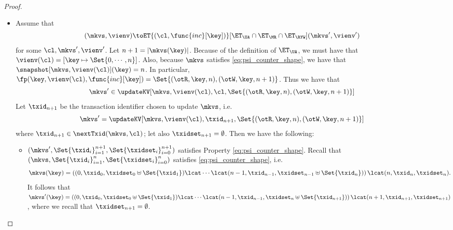 \begin{proof}
\begin{itemize}
\item 
Assume that
\[
(\mkvs, \vienv) \toET{(\cl, \func{inc}[\key])}[\ET_{\UA} \cap \ET_{\MR} \cap  \ET_{\RYW}] (\mkvs', \vienv')
\]
for some $\cl, \mkvs', \vienv'$. Let $n+1 = \lvert \mkvs(\key) \rvert$. Because of the definition of 
$\ET_{\UA}$, we must have that $\vienv(\cl) = [\key \mapsto \Set{0, \cdots, n}]$. Also, 
because $\mkvs$ satisfies \eqref{eq:psi_counter_shape}, we have that $\snapshot[\mkvs, \vienv(\cl)](\key) = n$. 
In particular, $\fp(\key, \vienv(\cl), \func{inc}[\key]) = \Set{(\otR, \key, n), (\otW, \key, n+1)}$. 
Thus we have that 
\[\mkvs' \in \updateKV[\mkvs, \vienv(\cl), \cl, \Set{(\otR, \key, n), (\otW, \key, n+1)}] \]
Let $\txid_{n+1}$ be the transaction identifier 
chosen to update $\mkvs$, i.e. \[\mkvs' = \updateKV[\mkvs, \vienv(\cl), \txid_{n+1}, \Set{(\otR, \key, n), (\otW, \key, n+1)}]\]
where $\txid_{n+1} \in \nextTxid(\mkvs, \cl)$; 
let also $\txidset_{n+1} = \emptyset$. Then we have the following: 
\begin{itemize}
\item  $(\mkvs', \Set{\txid_{i}}_{i=1}^{n+1}, \Set{\txidset_{i}}_{i=0}^{n+1})$ satisfies Property \eqref{eq:psi_counter_shape}. 
Recall that $(\mkvs, \Set{\txid_{i}}_{i=1}^{n}, \Set{\txidset_{i}}_{i=0}^{n})$ satisfies \eqref{eq:psi_counter_shape}, 
i.e.
\[\mkvs(\key) = \left( (0, \txid_{0}, \txidset_{0} \uplus \Set{\txid_1}) \lcat \cdots \lcat (n-1, \txid_{n-1}, \txidset_{n-1} \uplus \Set{\txid_{n}}) \right) 
\lcat (n, \txid_{n}, \txidset_{n}).
\]
It follows that $\mkvs'(\key) = \left( (0, \txid_{0}, \txidset_{0} \uplus \Set{\txid_1}) \lcat \cdots \lcat (n-1, \txid_{n-1}, \txidset_{n} \uplus \Set{\txid_{n+1}}) \right) 
\lcat (n+1, \txid_{n+1}, \txidset_{n+1})$, 
where we recall that $\txidset_{n+1} = \emptyset$.


\end{itemize}
\end{itemize}
\end{proof}
